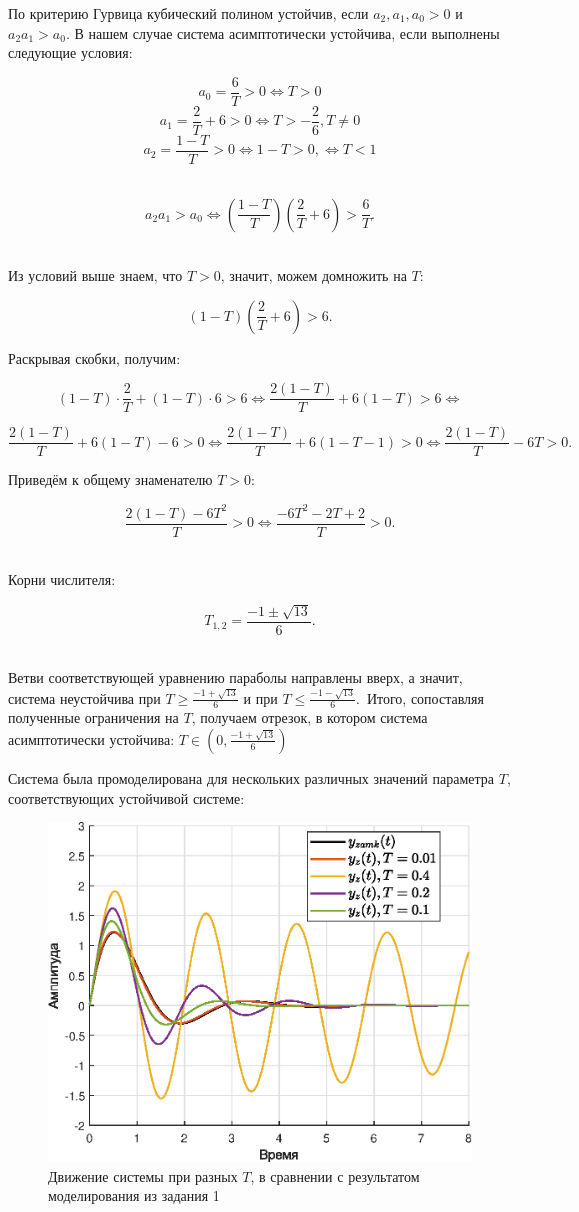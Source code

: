 \documentclass[a4paper]{article}
\begin{document}
По критерию Гурвица кубический полином устойчив, если $a_2, a_1, a_0 > 0$ и $a_2 a_1 > a_0$. В нашем случае система асимптотически устойчива, если выполнены следующие условия:

$$
a_0 = \frac{6}{T} > 0 \Leftrightarrow T > 0
$$
$$
a_1 = \frac{2}{T} + 6 > 0 \Leftrightarrow T > -\frac{2}{6}, T\neq0
$$
$$
a_2 = \frac{1 - T}{T} > 0 \Leftrightarrow 1 - T > 0, \Leftrightarrow T < 1
$$\ 

$$a_2 a_1 > a_0 \Leftrightarrow
\left(\frac{1 - T}{T}\right) \left(\frac{2}{T} + 6\right) > \frac{6}{T}.
$$\ 

Из условий выше знаем, что $T > 0$, значит, можем домножить на $T$:

\[
(1 - T)\left(\frac{2}{T} + 6\right) > 6.
\]

Раскрывая скобки, получим:

\[
(1 - T)\cdot\frac{2}{T} + (1 - T)\cdot6 > 6\Leftrightarrow
\frac{2(1 - T)}{T} + 6(1 - T) > 6\Leftrightarrow
\]

\[
\frac{2(1 - T)}{T} + 6(1 - T) - 6 > 0\Leftrightarrow
\frac{2(1 - T)}{T} + 6(1 - T - 1) > 0\Leftrightarrow
\frac{2(1 - T)}{T} - 6T > 0.
\]

Приведём к общему знаменателю \(T > 0\):

\[
\frac{2(1 - T) - 6T^2}{T} > 0\Leftrightarrow
\frac{-6T^2 - 2T + 2}{T} > 0.
\]\

Корни числителя:

\[
T_{1, 2} = \frac{-1 \pm \sqrt{13}}{6}.
\]\ 

Ветви соответствующей уравнению параболы направлены вверх, а значит, система неустойчива при $T \ge \frac{-1 + \sqrt{13}}{6}$ и при $T\le \frac{-1 - \sqrt{13}}{6}$.\ Итого, сопоставляя полученные ограничения на $T$, получаем отрезок, в котором система асимптотически устойчива: $T \in \left(0, \frac{-1 + \sqrt{13}}{6}\right)$

Система была промоделирована для нескольких различных значений параметра $T$, соответствующих устойчивой системе:

\begin{figure}[H]
    \centering
    \includegraphics[width=0.65\linewidth]{ex2/all.eps}
    \caption{Движение системы при разных $T$, в сравнении с результатом моделирования из задания 1}
\end{figure}\
\end{document}
